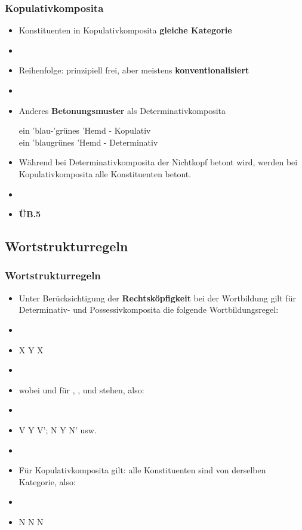 \begin{frame}
\frametitle{Kopulativkomposita}

\begin{itemize}
	\item Konstituenten in Kopulativkomposita \ras \textbf{gleiche Kategorie}
	\item[]
	\item Reihenfolge: prinzipiell frei, aber meistens \textbf{konventionalisiert}
	\item[]
	\item Anderes \textbf{Betonungsmuster} als Determinativkomposita
	
	\ea ein 'blau-'grünes 'Hemd - Kopulativ \\
		 ein 'blaugrünes 'Hemd - Determinativ
	\z
		 
	\item Während bei Determinativkomposita der Nichtkopf betont wird, werden bei Kopulativkomposita alle Konstituenten betont.
	\item[]
	\item[] \textbf{ÜB.5}
\end{itemize}


\end{frame}


\subsection{Wortstrukturregeln}


\begin{frame}
\frametitle{Wortstrukturregeln}

\begin{itemize}
	\item Unter Berücksichtigung der \textbf{Rechtsköpfigkeit} bei der Wortbildung gilt für Determinativ- und Possessivkomposita die folgende Wortbildungsregel:
	\item[]
	\item X \ras Y X
	\item[]
	\item wobei  und  für , ,  und  stehen, also:
	\item[]
	\item V \ras Y V'; N \ras Y N' usw.
	\item 	
	\item Für Kopulativkomposita gilt: alle Konstituenten sind von derselben Kategorie, also:
	\item[]
	\item N \ras N N 
\end{itemize}


\end{frame}


